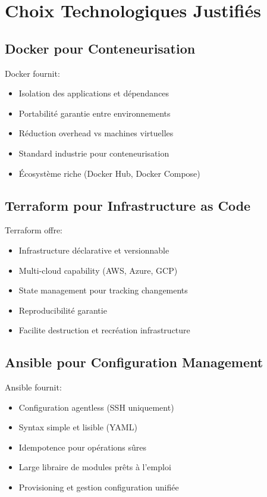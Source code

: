 \documentclass[12pt,a4paper]{report}
\begin{document}
\section{Choix Technologiques Justifiés}

\subsection{Docker pour Conteneurisation}

Docker fournit:
\begin{itemize}
    \item Isolation des applications et dépendances
    \item Portabilité garantie entre environnements
    \item Réduction overhead vs machines virtuelles
    \item Standard industrie pour conteneurisation
    \item Écosystème riche (Docker Hub, Docker Compose)
\end{itemize}

\subsection{Terraform pour Infrastructure as Code}

Terraform offre:
\begin{itemize}
    \item Infrastructure déclarative et versionnable
    \item Multi-cloud capability (AWS, Azure, GCP)
    \item State management pour tracking changements
    \item Reproducibilité garantie
    \item Facilite destruction et recréation infrastructure
\end{itemize}

\subsection{Ansible pour Configuration Management}

Ansible fournit:
\begin{itemize}
    \item Configuration agentless (SSH uniquement)
    \item Syntax simple et lisible (YAML)
    \item Idempotence pour opérations sûres
    \item Large libraire de modules prêts à l'emploi
    \item Provisioning et gestion configuration unifiée
\end{itemize}
\end{document}
